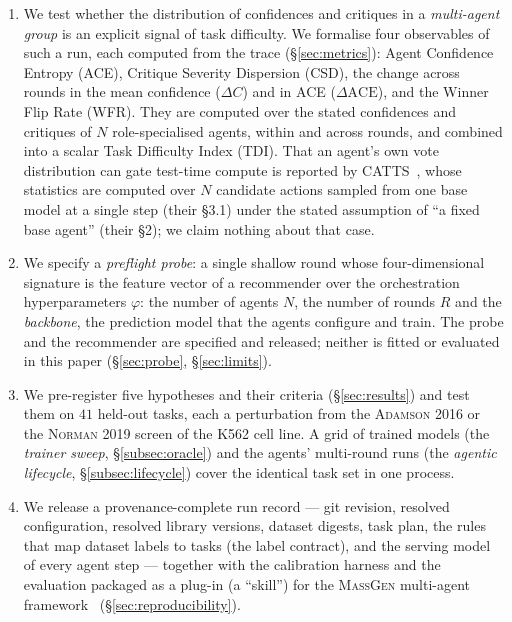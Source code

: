 \documentclass[10pt,a4paper]{article}
\begin{document}
\begin{enumerate}[leftmargin=*]
  \item We test whether the distribution of confidences and critiques in a
        \emph{multi-agent group} is an explicit signal of task difficulty. We
        formalise four observables of such a run, each computed from the trace
        (\S\ref{sec:metrics}): Agent Confidence Entropy (ACE), Critique Severity
        Dispersion (CSD), the change across rounds in the mean confidence
        ($\Delta C$) and in ACE ($\Delta\mathrm{ACE}$), and the Winner Flip
        Rate (WFR). They are computed over the stated confidences and
        critiques of $N$ role-specialised agents, within and across rounds,
        and combined into a scalar Task Difficulty Index (TDI). That an
        agent's own vote distribution can gate test-time compute is reported
        by \textsc{CATTS}~\citep{lee2026catts}, whose statistics are computed
        over $N$ candidate actions sampled from one base model at a single
        step (their \S3.1) under the stated assumption of ``a fixed base
        agent'' (their \S2); we claim nothing about that case.
  \item We specify a \emph{preflight probe}: a single shallow round whose
        four-dimensional signature is the feature vector of a recommender
        over the orchestration hyperparameters $\varphi$: the number of agents
        $N$, the number of rounds $R$ and the \emph{backbone}, the prediction
        model that the agents configure and train. The probe and the recommender
        are specified and released; neither is fitted or evaluated in this
        paper (\S\ref{sec:probe}, \S\ref{sec:limits}).
  \item We pre-register five hypotheses and their criteria
        (\S\ref{sec:results}) and test them
        on $41$ held-out tasks, each a perturbation from the
        \textsc{Adamson 2016} or the \textsc{Norman 2019} screen of the K562 cell
        line. A grid of trained models (the \emph{trainer sweep},
        \S\ref{subsec:oracle}) and the agents' multi-round runs (the
        \emph{agentic lifecycle}, \S\ref{subsec:lifecycle}) cover the identical
        task set in one process.
  \item We release a provenance-complete run record --- git revision,
        resolved configuration, resolved library versions, dataset digests,
        task plan, the rules that map dataset labels to tasks (the label
        contract), and the serving model of every agent step --- together with
        the calibration harness and the evaluation packaged as a plug-in (a
        ``skill'') for the \textsc{MassGen} multi-agent
        framework~\citep{massgen2025github} (\S\ref{sec:reproducibility}).
\end{enumerate}
\end{document}

